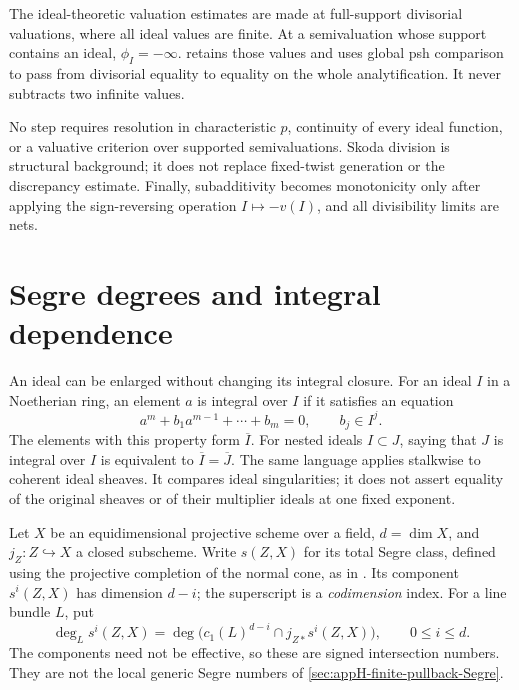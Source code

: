 \begin{remark}
\label{rem:appC-supported-points}
The ideal-theoretic valuation estimates are made at full-support
divisorial valuations, where all ideal values are finite.  At a
semivaluation whose support contains an ideal, \(\phi_I=-\infty\).
 retains those values and uses
global psh comparison to pass from divisorial equality to equality on the
whole analytification.  It never subtracts two infinite values.
\end{remark}

\begin{remark}
\label{rem:appC-excluded-imports}
No step requires resolution in characteristic \(p\), continuity of every
ideal function, or a valuative criterion over supported semivaluations.
Skoda division is structural background; it does not replace fixed-twist
generation or the discrepancy estimate.  Finally, subadditivity becomes
monotonicity only after applying the sign-reversing operation \(I\mapsto
-v(I)\), and all divisibility limits are nets.
\end{remark}

\section{Segre degrees and integral dependence}
\label{sec:appC-Segre-dependence}

An ideal can be enlarged without changing its integral closure.
For an ideal $I$ in a Noetherian ring, an element $a$ is integral
over $I$ if it satisfies an equation
\[
 a^m+b_1a^{m-1}+\cdots+b_m=0,
 \qquad b_j\in I^j.
\tag{C.31}\label{eq:appC-integral-ideal-equation}
\]
The elements with this property form $\overline I$. For nested
ideals $I\subset J$, saying that $J$ is integral over $I$ is
equivalent to $\overline I=\overline J$. The same language applies
stalkwise to coherent ideal sheaves. It compares ideal singularities;
it does not assert equality of the original sheaves or of their
multiplier ideals at one fixed exponent.

Let $X$ be an equidimensional projective scheme over a field,
$d=\dim X$, and $j_Z:Z\hookrightarrow X$ a closed subscheme.
Write $s(Z,X)$ for its total Segre class, defined using the
projective completion of the normal cone, as in
\cite[\S2]{CidRuiz26SegrePublished}. Its component
$s^i(Z,X)$ has dimension $d-i$; the superscript is a
\emph{codimension} index. For a line bundle $L$, put
\[
 \deg_L s^i(Z,X)
 =\deg\bigl(c_1(L)^{d-i}\cap j_{Z*}s^i(Z,X)\bigr),
 \qquad 0\leq i\leq d.
\tag{C.32}\label{eq:appC-Segre-degrees}
\]
The components need not be effective, so these are signed
intersection numbers. They are not the local generic Segre numbers
of \cref{sec:appH-finite-pullback-Segre}.

